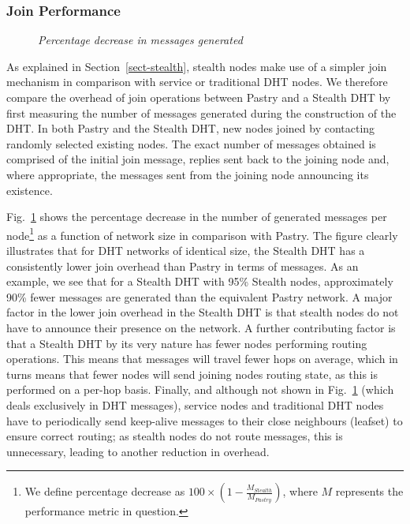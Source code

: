 \documentclass[letterpaper]{sig-alternate} %
\begin{document}
\subsubsection{Join Performance}
\label{sect-join-performance}

\begin{figure}[tb]
\centering {}
\caption{\em Percentage decrease in messages generated} \label{fig:joins}
\end{figure}

As explained in Section~\ref{sect-stealth}, stealth nodes make use
of a simpler join mechanism in comparison with service or
traditional DHT nodes. We therefore compare the overhead of join
operations between Pastry and a Stealth DHT by first measuring the
number of messages generated during the construction of the DHT. In
both Pastry and the Stealth DHT, new nodes joined by contacting
randomly selected existing nodes. The exact number of messages
obtained is comprised of the initial join message, replies sent back
to the joining node and, where appropriate, the messages sent from
the joining node announcing its existence.

Fig.~\ref{fig:joins} shows the percentage decrease in the number of
generated messages per node\footnote{We define percentage decrease
as $100 \times (1 - \frac{M_{Stealth}}{M_{Pastry}})$, where $M$
represents the performance metric in question. } as a function of
network size in comparison with Pastry. The figure clearly
illustrates that for DHT networks of identical size, the Stealth DHT
has a consistently lower join overhead than Pastry in terms of
messages. As an example, we see that for a Stealth DHT with 95\%
Stealth nodes, approximately 90\% fewer messages are generated than
the equivalent Pastry network. A major factor in the lower join
overhead in the Stealth DHT is that stealth nodes do not have to
announce their presence on the network. A further contributing
factor is that a Stealth DHT by its very nature has fewer nodes
performing routing operations. This means that messages will travel
fewer hops on average, which in turns means that fewer nodes will
send joining nodes routing state, as this is performed on a per-hop
basis. Finally, and although not shown in Fig.~\ref{fig:joins}
(which deals exclusively in DHT messages), service nodes and
traditional DHT nodes have to periodically send keep-alive messages
to their close neighbours (leafset) to ensure correct routing; as
stealth nodes do not route messages, this is unnecessary, leading to
another reduction in overhead.
\end{document}
